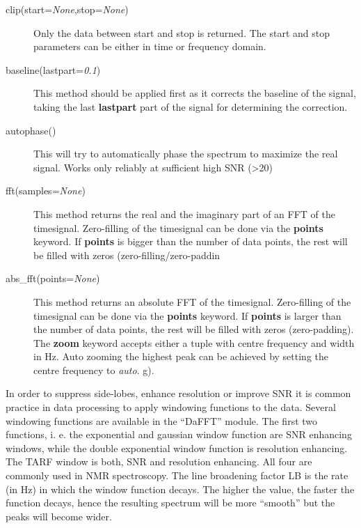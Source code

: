 \documentclass[12pt, a4paper, BCOR10mm, twoside, titlepage, headinclude]{scrbook}
\begin{document}
\begin{description}

\item[clip(start=\textit{None},stop=\textit{None})]
Only the data between start and stop is returned.
The start and stop parameters can be either in  time or frequency domain.

\item[baseline(lastpart=\textit{0.1})]
This method should be applied first as it corrects the baseline of the signal, taking the last \textbf{lastpart} part of the signal for determining the correction.

\item[autophase()]
This will try to automatically phase the spectrum to maximize the real signal. Works only reliably at sufficient high SNR (>20)

\item[fft(samples=\textit{None})]
This method returns the real and the imaginary part of an FFT of the timesignal. Zero-filling of the timesignal can be done via the \textbf{points} keyword. If \textbf{points} is bigger than the number of data points, the rest will be filled with zeros (zero-filling/zero-paddin


\item[abs\_fft(points=\textit{None})]
This method returns an absolute FFT of the timesignal. Zero-filling of the timesignal can be done via the \textbf{points} keyword. If \textbf{points} is larger than the number of data points, the rest will be filled with zeros (zero-padding). The \textbf{zoom} keyword accepts either a tuple with centre frequency and width in Hz. Auto zooming the highest peak can be achieved by setting the centre frequency to \textit{auto}.
g).
\end{description}
%
In order to suppress side-lobes, enhance resolution or improve SNR it is common practice in data processing to apply windowing functions to the data.
Several windowing functions are available in the ``DaFFT'' module. The first two functions, i. e. the exponential and gaussian window function are SNR enhancing windows, while the double exponential window function is resolution enhancing.
The TARF window is both, SNR and resolution enhancing\citep{Traficante:1987fk}.
 All four are commonly used in NMR spectroscopy. The line broadening factor LB is the rate (in Hz) in which the window function decays. The higher the value, the faster the function decays, hence the resulting spectrum will be more ``smooth'' but the peaks will become wider.
\end{document}
